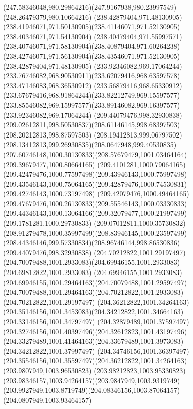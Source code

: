 {    \curveto(247.58346048,980.29864216)(247.9167938,980.23997549)(248.26479379,980.10664216)
    \moveto(238.42879404,971.48130905)
    \curveto(238.41946071,971.50130905)(238.41146071,971.52130905)(238.40346071,971.54130904)
    \curveto(238.40479404,971.55997571)(238.40746071,971.58130904)(238.40879404,971.60264238)
    \curveto(238.42746071,971.56130904)(238.43546071,971.52130905)(238.42879404,971.48130905)
    \moveto(233.92346082,969.17064244)
    \curveto(233.76746082,968.90530911)(233.62079416,968.63597578)(233.47146083,968.36530912)
    \curveto(233.56879416,968.65330912)(233.67679416,968.91864244)(233.82212749,969.15597577)
    \curveto(233.85546082,969.15997577)(233.89146082,969.16397577)(233.92346082,969.17064244)
    \moveto(209.44079476,998.32930838)
    \curveto(209.02612811,998.50530837)(208.61146145,998.68397503)(208.20212813,998.87597503)
    \curveto(208.19412813,999.06797502)(208.13412813,999.26930835)(208.0647948,999.40530835)
    \curveto(207.60746148,1000.30130833)(208.57679479,1001.03464164)(209.39679477,1000.80664165)
    \curveto(209.4101281,1000.79064165)(209.42479476,1000.77597498)(209.43946143,1000.75997498)
    \curveto(209.43546143,1000.75064165)(209.42879476,1000.74530831)(209.42746143,1000.73197498)
    \curveto(209.42079476,1000.49464165)(209.47679476,1000.26130833)(209.55546143,1000.03330833)
    \curveto(209.44346143,1000.13064166)(209.32079477,1000.21997499)(209.1781281,1000.29730833)
    \curveto(209.07012811,1000.35730832)(208.91279478,1000.35997499)(208.83946145,1000.23597499)
    \curveto(208.44346146,999.57330834)(208.96746144,998.86530836)(209.44079476,998.32930838)
    \moveto(204.70212822,1001.29197497)
    \curveto(204.70079488,1001.2933083)(204.69946155,1001.2933083)(204.69812822,1001.2933083)
    \curveto(204.69946155,1001.2933083)(204.69946155,1001.29464163)(204.70079488,1001.29597497)
    \curveto(204.70079488,1001.29464163)(204.70212822,1001.2933083)(204.70212822,1001.29197497)
    \moveto(204.36212822,1001.34264163)
    \curveto(204.35146156,1001.3453083)(204.34212822,1001.34664163)(204.33146156,1001.34797497)
    \curveto(204.32879489,1001.37597497)(204.32746156,1001.40397496)(204.32612823,1001.43197496)
    \curveto(204.33279489,1001.41464163)(204.33679489,1001.3973083)(204.34212822,1001.37997497)
    \curveto(204.34746156,1001.36397497)(204.35546156,1001.35597497)(204.36212822,1001.34264163)
    \moveto(203.9807949,1003.96530823)
    \curveto(203.98212823,1003.95330823)(203.98346157,1003.94264157)(203.9847949,1003.9319749)
    \curveto(203.9927949,1003.8719749)(204.08346156,1003.87064157)(204.0807949,1003.93464157)
}
